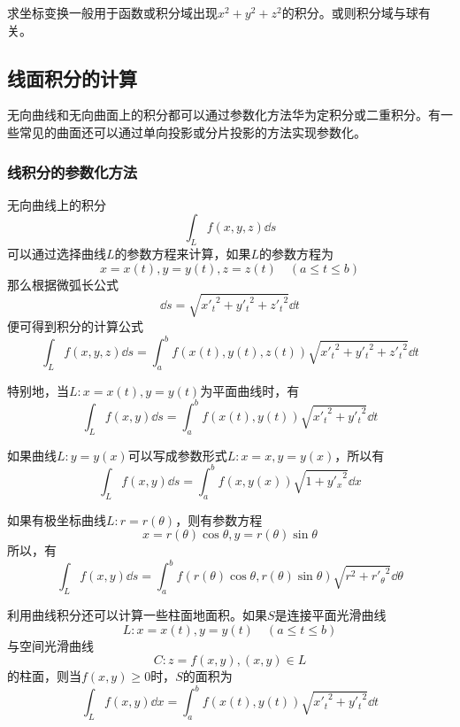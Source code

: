 \begin{situation}
    求坐标变换一般用于函数或积分域出现$x^2 + y^2 + z^2$的积分。或则积分域与球有关。
\end{situation}

\subsection{线面积分的计算}
无向曲线和无向曲面上的积分都可以通过参数化方法华为定积分或二重积分。有一些常见的曲面还可以通过单向投影或分片投影的方法实现参数化。
\subsubsection{线积分的参数化方法}
无向曲线上的积分
\[ \int_L f(x,y,z)\dd{s} \]
可以通过选择曲线$L$的参数方程来计算，如果$L$的参数方程为
\[ x=x(t), y=y(t), z=z(t) \quad (a\leq t \leq b) \]
那么根据微弧长公式
\[ \dd{s} = \sqrt{{x'_t}^2 + {y'_t}^2 + {z'_t}^2} \dd{t} \]
便可得到积分的计算公式
\begin{equation}
    \int_L f(x,y,z)\dd{s} = \int_a^b f(x(t),y(t),z(t))\sqrt{{x'_t}^2 + {y'_t}^2 + {z'_t}^2}\dd{t}
\end{equation}

特别地，当$L: x=x(t),y=y(t)$为平面曲线时，有
\begin{equation}
    \int_L f(x,y)\dd{s} = \int_a^b f(x(t),y(t)) \sqrt{{x'_t}^2 +{y'_t}^2} \dd{t}
\end{equation}

如果曲线$L:y=y(x)$可以写成参数形式$L: x=x ,y=y(x)$，所以有
\begin{equation}
    \int_L f(x,y)\dd{s} = \int_a^b f(x,y(x))\sqrt{1 + {y'_x}^2}\dd{x}
\end{equation}

如果有极坐标曲线$L: r=r(\theta)$，则有参数方程
\[ x=r(\theta)\cos\theta, y=r(\theta)\sin\theta \]
所以，有
\begin{equation}
    \int_L f(x,y)\dd{s} = \int_a^b f(r(\theta)\cos\theta,r(\theta)\sin\theta)\sqrt{r^2 + {r'_\theta}^2}\dd{\theta}
\end{equation}

利用曲线积分还可以计算一些柱面地面积。如果$S$是连接平面光滑曲线
\[ L : x=x(t),y=y(t)\quad (a\leq t\leq b) \]
与空间光滑曲线
\[ C : z=f(x,y), (x,y)\in L \]
的柱面，则当$f(x,y)\geq 0$时，$S$的面积为
\[ \int_L f(x,y)\dd{x} = \int_a^b f(x(t),y(t))\sqrt{{x'_t}^2+{y'_t}^2}\dd{t} \]

